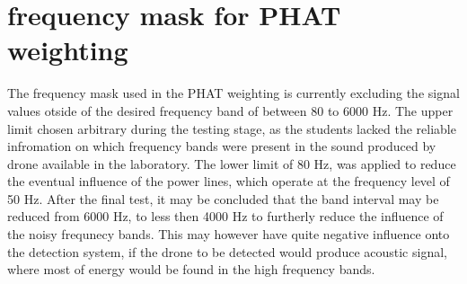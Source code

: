 \section{frequency mask for PHAT weighting}
The frequency mask used in the PHAT weighting is currently excluding the signal values otside of the desired frequency band of between 80 to 6000 Hz. The upper limit chosen arbitrary during the testing stage, as the students lacked the reliable infromation on which frequency bands were present in the sound produced by drone available in the laboratory. The lower limit of 80 Hz, was applied to reduce the eventual influence of the power lines, which operate at the frequency level of 50 Hz. After the final test, it may be concluded that the band interval may be reduced from 6000 Hz, to less then 4000 Hz to furtherly reduce the influence of the noisy frequnecy bands. This may however have quite negative influence onto the detection system, if the drone to be detected would produce acoustic signal, where most of energy would be found in the high frequency bands.  












